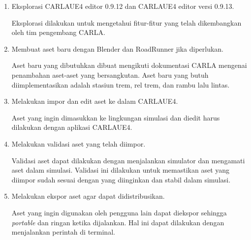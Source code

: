 

\begin{enumerate}

	\item Eksplorasi CARLAUE4 editor 0.9.12 dan CARLAUE4 editor versi 0.9.13.

	Eksplorasi dilakukan untuk mengetahui fitur-fitur yang telah dikembangkan
	oleh tim pengembang CARLA.

	\item Membuat aset baru dengan Blender dan RoadRunner jika diperlukan.

	Aset baru yang dibutuhkan dibuat mengikuti dokumentasi CARLA mengenai
	penambahan aset-aset yang bersangkutan. Aset baru yang butuh
	diimplementasikan adalah stasiun trem, rel trem, dan rambu lalu lintas.

	\item Melakukan impor dan edit aset ke dalam CARLAUE4.

	Aset yang ingin dimasukkan ke lingkungan simulasi dan diedit harus dilakukan
	dengan aplikasi CARLAUE4.




	\item Melakukan validasi aset yang telah diimpor.

	Validasi aset dapat dilakukan dengan menjalankan simulator dan mengamati
	aset dalam simulasi. Validasi ini dilakukan untuk memastikan aset yang
	diimpor sudah sesuai dengan yang diinginkan dan stabil dalam simulasi.

	\item Melakukan ekspor aset agar dapat didistribusikan.

	Aset yang ingin digunakan oleh pengguna lain dapat diekspor sehingga
	\textit{portable} dan ringan ketika dijalankan. Hal ini dapat dilakukan
	dengan menjalankan perintah di terminal.

\end{enumerate}
